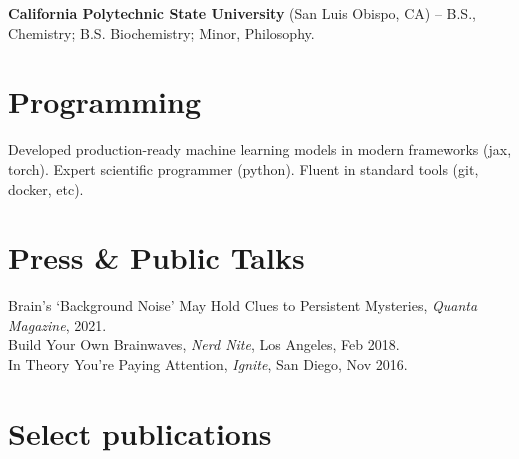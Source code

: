 \documentclass[margin,line]{res}
\begin{document}
\begin{resume}
\vspace*{-.15in}
{\bf California Polytechnic State University} (San Luis Obispo, CA) -- B.S., Chemistry; B.S. Biochemistry; Minor, Philosophy.\\

\vspace{-.5cm}
\section{\sc Programming} Developed production-ready machine learning models in modern frameworks (jax, torch). Expert scientific programmer (python). Fluent in standard tools (git, docker, etc).

\vspace{-.2cm}
\section{\sc Press \& Public Talks}
Brain's `Background Noise' May Hold Clues to Persistent Mysteries, \emph{Quanta Magazine}, 2021. \\
Build Your Own Brainwaves, \emph{Nerd Nite}, Los Angeles, Feb 2018. \\
In Theory You're Paying Attention, \emph{Ignite}, San Diego, Nov 2016. \\
    
\vspace{-.5cm} 
\section{\sc Select publications}


\end{resume}
\end{document}
